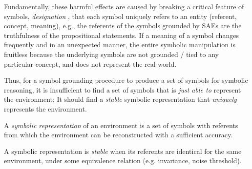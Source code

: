 Fundamentally,
these harmful effects are caused by breaking a critical feature of symbols, \emph{designation} \cite{newell1976computer,newell1980physical},
that each symbol uniquely refers to an entity (referent, concept, meaning),
e.g., the referents of the symbols grounded by SAEs are the truthfulness of the propositional statements.
If a meaning of a symbol changes frequently and in an unexpected manner, the entire symbolic manipulation is fruitless
because the underlying symbols are not grounded / tied to any particular concept, and does not represent the real world.


Thus, for a symbol grounding procedure to produce a set of symbols for symbolic reasoning,
it is insufficient to find a set of symbols that is \emph{just able to} represent the environment;
It should find a \emph{stable} symbolic representation that \emph{uniquely} represents the environment.

\begin{defi}
A \emph{symbolic representation} of an environment is a set of symbols with referents
from which the environment can be reconstructed with a sufficient accuracy.
\end{defi}

\begin{defi}
A symbolic representation is \emph{stable} when its referents are identical
for the same environment, under some equivalence relation (e.g. invariance, noise threshold).
\end{defi}



